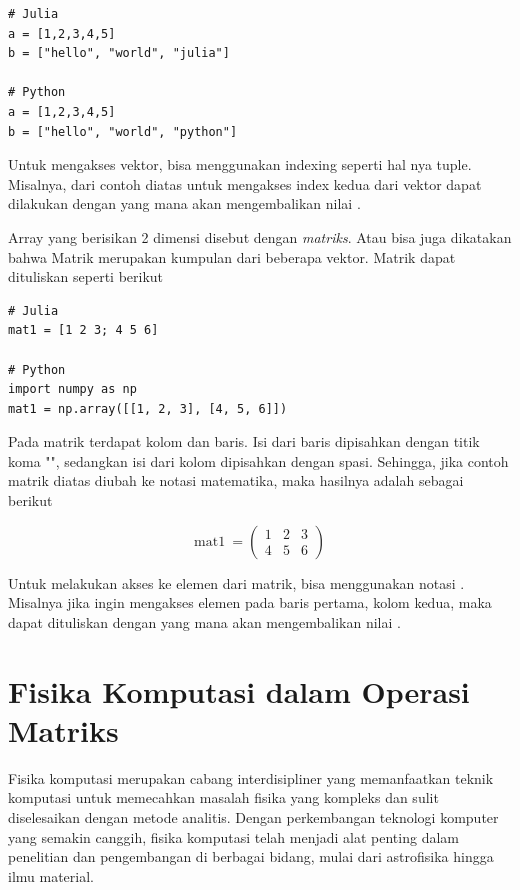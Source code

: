 \begin{lstlisting}
# Julia
a = [1,2,3,4,5]
b = ["hello", "world", "julia"]

# Python
a = [1,2,3,4,5]
b = ["hello", "world", "python"]
\end{lstlisting}

\noindent
Untuk mengakses vektor, bisa menggunakan indexing seperti hal nya tuple.
Misalnya, dari contoh diatas untuk mengakses index kedua dari vektor 
dapat dilakukan dengan  yang mana akan mengembalikan nilai .

Array yang berisikan 2 dimensi disebut dengan \emph{matriks}. Atau bisa juga
dikatakan bahwa Matrik merupakan kumpulan dari beberapa vektor. Matrik dapat
dituliskan seperti berikut

\begin{lstlisting}
# Julia
mat1 = [1 2 3; 4 5 6]

# Python
import numpy as np
mat1 = np.array([[1, 2, 3], [4, 5, 6]])
\end{lstlisting}

\noindent
Pada matrik terdapat kolom dan baris. Isi dari baris dipisahkan dengan titik
koma "\cw{;}", sedangkan isi dari kolom dipisahkan dengan spasi. Sehingga, jika
contoh matrik diatas diubah ke notasi matematika, maka hasilnya adalah sebagai berikut

\begin{equation}
  \text{mat1}\ = \left(
  \begin{matrix}
      1 & 2 & 3 \\
      4 & 5 & 6
    \end{matrix}
  \right)
\end{equation}

\noindent
Untuk melakukan akses ke elemen dari matrik, bisa menggunakan notasi .
Misalnya jika ingin mengakses elemen pada baris pertama, kolom kedua, maka dapat
dituliskan dengan  yang mana akan mengembalikan nilai .

\section{Fisika Komputasi dalam Operasi Matriks}

Fisika komputasi merupakan cabang interdisipliner yang memanfaatkan teknik
komputasi untuk memecahkan masalah fisika yang kompleks dan sulit diselesaikan
dengan metode analitis. Dengan perkembangan teknologi komputer yang semakin
canggih, fisika komputasi telah menjadi alat penting dalam penelitian dan
pengembangan di berbagai bidang, mulai dari astrofisika hingga ilmu material.

